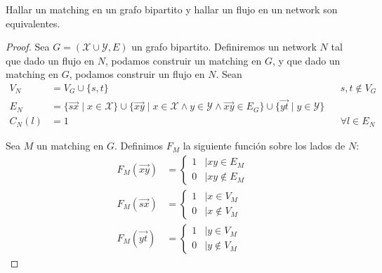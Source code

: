 \begin{theorem}
Hallar un matching en un grafo bipartito y hallar un flujo en un network son equivalentes.
\end{theorem}
\begin{proof}
Sea $G = (\mathcal{X} \cup \mathcal{Y}, E)$ un grafo bipartito.
Definiremos un network $N$ tal que dado un flujo en $N$, podamos construir un matching en $G$, y que dado un matching en $G$, podamos construir un flujo en $N$.
Sean
\begin{align}
    V_N &= V_G \cup \{s,t\} && s,t\notin V_G\\
    E_N &= \{\overrightarrow{sx} \mid x\in \mathcal{X}\} 
    \cup 
    \{\overrightarrow{xy} \mid x\in\mathcal{X} \wedge y\in\mathcal{Y} \wedge \overrightarrow{xy} \in E_G\}
    \cup 
    \{\overrightarrow{yt} \mid y\in \mathcal{Y}\}\\
    C_N (l) &= 1 && \forall l \in E_N
\end{align}

Sea $M$ un matching en $G$. Definimos $F_M$ la siguiente función sobre los lados de $N$:
\begin{align}
    F_M(\overrightarrow{xy}) &=
    \left\{
    \begin{array}{cc}
          1 & \mid xy \in E_M\\
          0 & \mid xy \notin E_M
    \end{array}\label{edges}
    \right. \\
    F_M(\overrightarrow{sx}) &= 
    \left\{
    \begin{array}{cc}
        1  & \mid x \in V_M\\
        0  & \mid x \notin V_M
    \end{array}\label{edges_s}
    \right. \\
    F_M(\overrightarrow{yt}) &=
    \left\{
    \begin{array}{cc}
        1  &\mid y \in V_M\\
        0  &\mid y \notin V_M
    \end{array}\label{edges_t}
    \right.
\end{align}


\end{proof}

